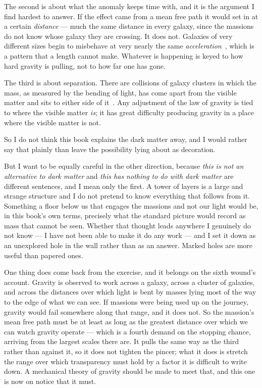 \documentclass[fontsize=11pt,paper=a4,pagesize=auto,parskip=half-]{scrbook}
\begin{document}
The second is about what the anomaly keeps time with, and it is the argument I find hardest to answer. If the effect came from a mean free path it would set in at a certain \emph{distance} --- much the same distance in every galaxy, since the massions do not know whose galaxy they are crossing. It does not. Galaxies of very different sizes begin to misbehave at very nearly the same \emph{acceleration}~\cite{mcgaugh2016}, which is a pattern that a length cannot make. Whatever is happening is keyed to how hard gravity is pulling, not to how far one has gone.

The third is about separation. There are collisions of galaxy clusters in which the mass, as measured by the bending of light, has come apart from the visible matter and sits to either side of it~\cite{clowe2006}. Any adjustment of the law of gravity is tied to where the visible matter \emph{is}; it has great difficulty producing gravity in a place where the visible matter is not.

So I do not think this book explains the dark matter away, and I would rather say that plainly than leave the possibility lying about as decoration.

But I want to be equally careful in the other direction, because \emph{this is not an alternative to dark matter} and \emph{this has nothing to do with dark matter} are different sentences, and I mean only the first. A tower of layers is a large and strange structure and I do not pretend to know everything that follows from it. Something a floor below us that engages the massions and not our light would be, in this book's own terms, precisely what the standard picture would record as mass that cannot be seen. Whether that thought leads anywhere I genuinely do not know --- I have not been able to make it do any work --- and I set it down as an unexplored hole in the wall rather than as an answer. Marked holes are more useful than papered ones.

One thing does come back from the exercise, and it belongs on the sixth wound's account. Gravity is observed to work across a galaxy, across a cluster of galaxies, and across the distances over which light is bent by masses lying most of the way to the edge of what we can see. If massions were being used up on the journey, gravity would fail somewhere along that range, and it does not. So the massion's mean free path must be at least as long as the greatest distance over which we can watch gravity operate --- which is a fourth demand on the stopping chance, arriving from the largest scales there are. It pulls the same way as the third rather than against it, so it does not tighten the pincer; what it does is stretch the range over which transparency must hold by a factor it is difficult to write down. A mechanical theory of gravity should be made to meet that, and this one is now on notice that it must.
\end{document}
